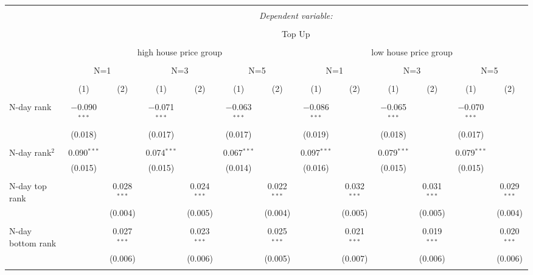 




\begin{tabular}{@{\extracolsep{2pt}}lcccccccccccc} 
		\\[-1.8ex]\hline 
\hline \\[-1.8ex] 
& \multicolumn{12}{c}{\textit{Dependent variable:}} \\ 
\cline{2-13} 
\\[-1.8ex] & \multicolumn{12}{c}{Top Up} \\ 
\\[-1.8ex] & \multicolumn{6}{c}{high house price group}& \multicolumn{6}{c}{low house price group} \\
\cmidrule(lr){2-7}
\cmidrule(lr){8-13}
\\[-1.8ex] & \multicolumn{2}{c}{N=1}& \multicolumn{2}{c}{N=3}& \multicolumn{2}{c}{N=5}&\multicolumn{2}{c}{N=1}& \multicolumn{2}{c}{N=3}& \multicolumn{2}{c}{N=5} \\
\cmidrule(lr){2-3}
\cmidrule(lr){4-5}
\cmidrule(lr){6-7}
\cmidrule(lr){8-9}
\cmidrule(lr){10-11}
\cmidrule(lr){12-13}
\\[-1.8ex] & (1) & (2) & (1) & (2)& (1) & (2) & (1) & (2)& (1) & (2) & (1) & (2)\\ 
\hline \\[-1.8ex] 
N-day rank & $-$0.090$^{***}$ &  & $-$0.071$^{***}$ &  & $-$0.063$^{***}$ &  & $-$0.086$^{***}$ &  & $-$0.065$^{***}$ &  & $-$0.070$^{***}$ &  \\ 
& (0.018) &  & (0.017) &  & (0.017) &  & (0.019) &  & (0.018) &  & (0.017) &  \\ 
& & & & & & & & & & & & \\ 
N-day rank$^2$ & 0.090$^{***}$ &  & 0.074$^{***}$ &  & 0.067$^{***}$ &  & 0.097$^{***}$ &  & 0.079$^{***}$ &  & 0.079$^{***}$ &  \\ 
& (0.015) &  & (0.015) &  & (0.014) &  & (0.016) &  & (0.015) &  & (0.015) &  \\ 
& & & & & & & & & & & & \\ 
N-day top rank &  & 0.028$^{***}$ &  & 0.024$^{***}$ &  & 0.022$^{***}$ &  & 0.032$^{***}$ &  & 0.031$^{***}$ &  & 0.029$^{***}$ \\ 
&  & (0.004) &  & (0.005) &  & (0.004) &  & (0.005) &  & (0.005) &  & (0.004) \\ 
& & & & & & & & & & & & \\ 
N-day bottom rank &  & 0.027$^{***}$ &  & 0.023$^{***}$ &  & 0.025$^{***}$ &  & 0.021$^{***}$ &  & 0.019$^{***}$ &  & 0.020$^{***}$ \\ 
&  & (0.006) &  & (0.006) &  & (0.005) &  & (0.007) &  & (0.006) &  & (0.006) \\ 
& & & & & & & & & & & & \\ 


\end{tabular}
